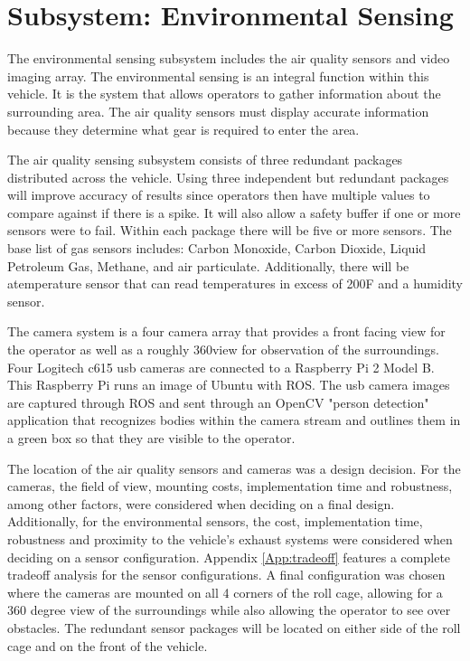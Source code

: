\chapter{Subsystem: Environmental Sensing}

The environmental sensing subsystem includes the air quality sensors and video imaging array. The environmental sensing is an integral function within this vehicle. It is the system that allows operators to gather information about the surrounding area. The air quality sensors must display accurate information because they determine what gear is required to enter the area.

The air quality sensing subsystem consists of three redundant packages distributed across the vehicle. Using three independent but redundant packages will improve accuracy of results since operators then have multiple values to compare against if there is a spike. It will also allow a safety buffer if one or more sensors were to fail. Within each package there will be five or more sensors. The base list of gas sensors includes: Carbon Monoxide, Carbon Dioxide, Liquid Petroleum Gas, Methane, and air particulate. Additionally, there will be atemperature sensor that can read temperatures in excess of 200\degree F and a humidity sensor. 

The camera system is a four camera array that provides a front facing view for the operator as well as a roughly 360\degree  view for observation of the surroundings. Four Logitech c615 usb cameras are connected to a Raspberry Pi 2 Model B. This Raspberry Pi runs an image of Ubuntu with ROS. The usb camera images are captured through ROS and sent through an OpenCV "person detection" application that recognizes bodies within the camera stream and outlines them in a green box so that they are visible to the operator. 

The location of the air quality sensors and cameras was a design decision. For the cameras, the field of view, mounting costs, implementation time and robustness, among other factors, were considered when deciding on a final design. Additionally, for the environmental sensors, the cost, implementation time, robustness and proximity to the vehicle's exhaust systems were considered when deciding on a sensor configuration. Appendix \ref{App:tradeoff} features a complete tradeoff analysis for the sensor configurations. A final configuration was chosen where the cameras are mounted on all 4 corners of the roll cage, allowing for a 360 degree view of the surroundings while also allowing the operator to see over obstacles. The redundant sensor packages will be located on either side of the roll cage and on the front of the vehicle. 